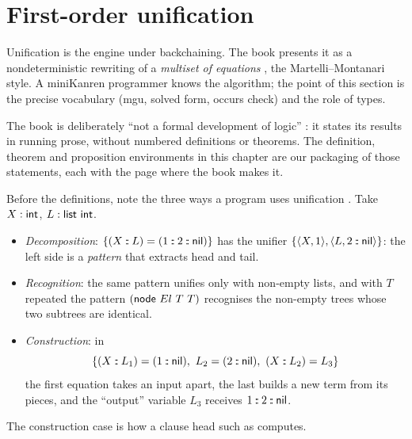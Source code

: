 \section{First-order unification}\label{sec:horn-unif}

Unification is the engine under backchaining. The book presents it as a nondeterministic rewriting of a
\emph{multiset of equations} , the Martelli--Montanari style. A miniKanren programmer knows
the algorithm; the point of this section is the precise vocabulary (mgu, solved form, occurs check) and
the role of types.

\begin{remark}
The book is deliberately ``not a formal development of logic'' : it states its results in
running prose, without numbered definitions or theorems. The definition, theorem and proposition
environments in this chapter are our packaging of those statements, each with the page where the book
makes it.
\end{remark}

Before the definitions, note the three ways a program uses unification . Take
$X:\mathsf{int}$, $L:\mathsf{list}\ \mathsf{int}$.
\begin{itemize}
  \item \emph{Decomposition}: $\{(X\mathbin{:\!:}L)=(1\mathbin{:\!:}2\mathbin{:\!:}\mathsf{nil})\}$ has the unifier
    $\{\langle X,1\rangle,\langle L,2\mathbin{:\!:}\mathsf{nil}\rangle\}$: the left side is a \emph{pattern} that
    extracts head and tail.
  \item \emph{Recognition}: the same pattern unifies only with non-empty lists, and with $T$ repeated
    the pattern $(\cst{node}\ El\ T\ T)$ recognises the non-empty trees whose two subtrees are
    identical.
  \item \emph{Construction}: in
    \[\{(X\mathbin{:\!:}L_1)=(1\mathbin{:\!:}\cst{nil}),\ L_2=(2\mathbin{:\!:}\cst{nil}),\
    (X\mathbin{:\!:}L_2)=L_3\}\]
    the first equation takes an input apart, the last builds a new term from its
    pieces, and the ``output'' variable $L_3$ receives $1\mathbin{:\!:}2\mathbin{:\!:}\mathsf{nil}$.
\end{itemize}
The construction case is how a clause head such as  computes.

